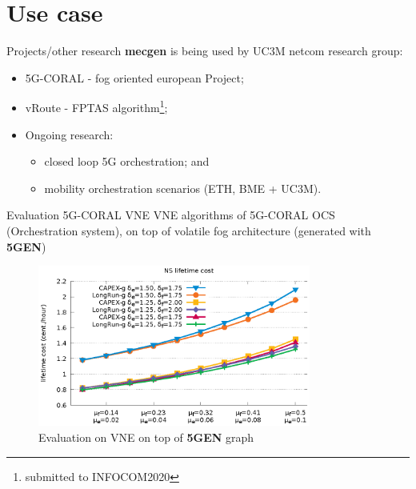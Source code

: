 \documentclass{beamer}
\begin{document}
\section{Use case}
\begin{frame}{Projects/other research}
    \textbf{mecgen} is being used by UC3M netcom research group:
    \begin{itemize}
        \item 5G-CORAL - fog oriented european Project;
        \item vRoute - FPTAS algorithm\footnote{submitted to INFOCOM2020};
        \item Ongoing research:
            \begin{itemize}
            \item closed loop 5G orchestration; and
            \item mobility orchestration scenarios (ETH, BME + UC3M).
        \end{itemize}
    \end{itemize}
\end{frame}


\begin{frame}{Evaluation 5G-CORAL VNE}
    VNE algorithms of 5G-CORAL OCS (Orchestration system), on top of volatile fog architecture (generated with \textbf{5GEN})

    \begin{figure}
        \includegraphics[width=0.8\textwidth]{img/lifecost.eps}
        \caption{Evaluation on VNE on top of \textbf{5GEN} graph}
    \end{figure}
\end{frame}
\end{document}
